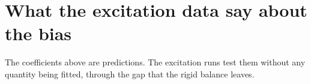\documentclass[10pt]{article}
\begin{document}
%
%

\section*{What the excitation data say about the bias}

The coefficients above are predictions. The excitation runs test them
without any quantity being fitted, through the gap that the rigid
balance leaves.
\end{document}
